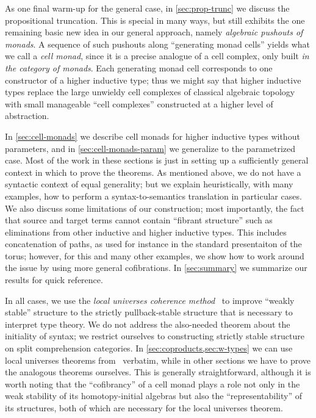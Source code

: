 \documentclass[referee]{psp}
\begin{document}
As one final warm-up for the general case, in \cref{sec:prop-trunc} we discuss the propositional truncation.
This is special in many ways, but still exhibits the one remaining basic new idea in our general approach, namely \emph{algebraic pushouts of monads}.
A sequence of such pushouts along ``generating monad cells'' yields what we call a \emph{cell monad}, since it is a precise analogue of a cell complex, only built \emph{in the category of monads}.
Each generating monad cell corresponds to one constructor of a higher inductive type; thus we might say that higher inductive types replace the large unwieldy cell complexes of classical algebraic topology with small manageable ``cell complexes'' constructed at a higher level of abstraction.

In \cref{sec:cell-monads} we describe cell monads for higher inductive types without parameters, and in \cref{sec:cell-monads-param} we generalize to the parametrized case.
Most of the work in these sections is just in setting up a sufficiently general context in which to prove the theorems.
As mentioned above, we do not have a syntactic context of equal generality; but we explain heuristically, with many examples, how to perform a syntax-to-semantics translation in particular cases.
We also discuss some limitations of our construction; most importantly, the fact that source and target terms cannot contain ``fibrant structure'' such as eliminations from other inductive and higher inductive types.
This includes concatenation of paths, as used for instance in the standard presentaiton of the torus; however, for this and many other examples, we show how to work around the issue by using more general cofibrations.
In \cref{sec:summary} we summarize our results for quick reference.

In all cases, we use the \emph{local universes coherence method}~\cite{lw:localuniv} to improve ``weakly stable'' structure to the strictly pullback-stable structure that is necessary to interpret type theory.
We do not address the also-needed theorem about the initiality of syntax; we restrict ourselves to constructing strictly stable structure on split comprehension categories.
In \cref{sec:coproducts,sec:w-types} we can use local universes theorems from~\cite{lw:localuniv} verbatim, while in other sections we have to prove the analogous theorems ourselves.
This is generally straightforward, although it is worth noting that the ``cofibrancy'' of a cell monad plays a role not only in the weak stability of its homotopy-initial algebras but also the ``representability'' of its structures, both of which are necessary for the local universes theorem.
\end{document}
